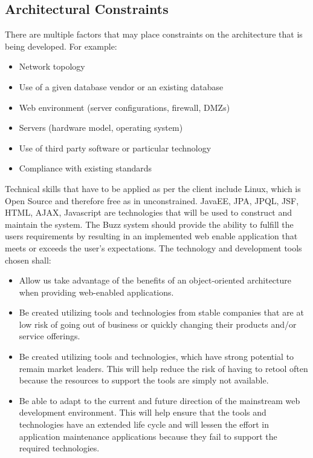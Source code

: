 \documentclass[a4paper]{article}
\begin{document}
\subsection{Architectural Constraints}
There are multiple factors that may place constraints on the architecture that is being developed. For example:
\begin{itemize}
\item	Network topology
\item	Use of a given database vendor or an existing database
\item	Web environment (server configurations, firewall, DMZs)
\item	Servers (hardware model, operating system)
\item	Use of third party software or particular technology
\item	Compliance with existing standards
\end{itemize}
Technical skills that have to be applied as per the client include Linux, which is Open Source and therefore free as in unconstrained. JavaEE, JPA, JPQL, JSF, HTML, AJAX, Javascript are technologies that will be used to construct and maintain the system. The Buzz system should provide the ability to fulfill the users requirements by resulting in an implemented web enable application that meets or exceeds the user’s expectations. The technology and development tools chosen shall:
\begin{itemize}
\item 	Allow us take advantage of the benefits of an object-oriented architecture when providing web-enabled applications.
\item	Be created utilizing tools and technologies from stable companies that are at low risk of going out of business or quickly changing their products and/or service offerings.
\item	Be created utilizing tools and technologies, which have strong potential to remain market leaders. This will help reduce the risk of having to retool often because the resources to support the tools are simply not available.
\item	Be able to adapt to the current and future direction of the mainstream web development environment. This will help ensure that the tools and technologies have an extended life cycle and will lessen the effort in application maintenance applications because they fail to support the required technologies.
\end{itemize}
\end{document}
